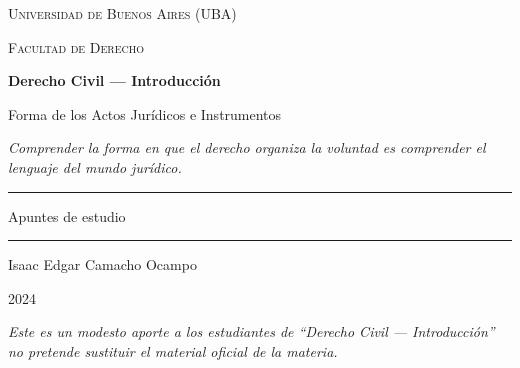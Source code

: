 \documentclass[12pt,oneside]{book}
\newcommand{\universidad}{Universidad de Buenos Aires (UBA)}
\newcommand{\facultad}{Facultad de Derecho}
\newcommand{\materia}{Derecho Civil — Introducción}
\newcommand{\titulo}{Forma de los Actos Jurídicos e Instrumentos}
\newcommand{\autor}{Isaac Edgar Camacho Ocampo}
\newcommand{\anio}{2024}
\begin{document}

\begin{titlepage}
\thispagestyle{empty}
\begin{center}

\vspace*{1cm}

{\large \textsc{\universidad}}

\vspace{0.2cm}

{\large \textsc{\facultad}}

\vspace{3cm}

{\Huge \textbf{\materia}}

\vspace{1cm}

{\LARGE \titulo}

\vspace{0.8cm}

\textit{Comprender la forma en que el derecho organiza la voluntad es comprender el lenguaje del mundo jurídico.}

\vspace{1.2cm}

\rule{0.70\textwidth}{0.5pt}

\vspace{0.5cm}

{\large Apuntes de estudio}

\vspace{0.5cm}

\rule{0.70\textwidth}{0.5pt}

\vfill

{\large \autor}

\vspace{0.3cm}

{\large \anio}

\end{center}

\vfill

\begin{flushleft}
\textit{Este es un modesto aporte a los estudiantes de ``Derecho Civil --- Introducción'' no pretende sustituir el material oficial de la materia.}
\end{flushleft}

\end{titlepage}

\tableofcontents
\newpage
\end{document}
